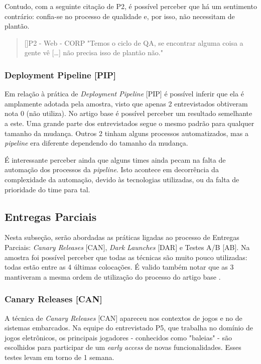 Contudo, com a seguinte citação de P2, é possível perceber que há um sentimento contrário: confia-se no processo de qualidade e, por isso, não necessitam de plantão.

\begin{quotation}[]{P2 - Web - CORP}
    "Temos o ciclo de QA, se encontrar alguma coisa a gente vê […] não precisa isso de plantão não." 
\end{quotation}

\subsubsection{Deployment Pipeline [PIP]}

Em relação à prática de \emph{Deployment Pipeline} [PIP] é possível inferir que ela é amplamente adotada pela amostra, visto que apenas 2 entrevistados obtiveram nota 0 (não utiliza). No artigo base é possível perceber um resultado semelhante a este. Uma grande parte dos entrevistados segue o mesmo padrão para qualquer tamanho da mudança. Outros 2 tinham alguns processos automatizados, mas a \emph{pipeline} era diferente dependendo do tamanho da mudança.

É interessante perceber ainda que alguns times ainda pecam na falta de automação dos processos da \emph{pipeline}. Isto acontece em decorrência da complexidade da automação, devido às tecnologias utilizadas, ou da falta de prioridade do time para tal.
 
\subsection{Entregas Parciais}

Nesta subseção, serão abordadas as práticas ligadas ao processo de Entregas Parciais: \emph{Canary Releases} [CAN], \emph{Dark Launches} [DAR] e Testes A/B [AB]. Na amostra foi possível perceber que todas as técnicas são muito pouco utilizadas: todas estão entre as 4 últimas colocações. É valido também notar que as 3 mantiveram a mesma ordem de utilização do processo do artigo base \cite{empiricalStudy2016}.

\subsubsection{Canary Releases [CAN]}

A técnica de \emph{Canary Releases} [CAN] apareceu nos contextos de jogos e no de sistemas embarcados. Na equipe do entrevistado P5, que trabalha no domínio de jogos eletrônicos, os principais jogadores - conhecidos como "baleias" - são escolhidos para participar de um \emph{early access} de novas funcionalidades.  Esses testes levam em torno de 1 semana. 

